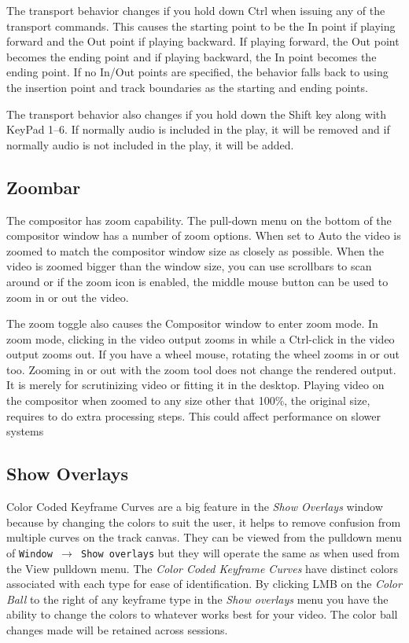 The transport behavior changes if you hold down Ctrl when issuing any of the transport commands. This causes the starting point to be the In point if playing forward and the Out point if playing backward. If playing forward, the Out point becomes the ending point and if playing backward, the In point becomes the ending point. If no In/Out points are specified, the behavior falls back to using the insertion point and track boundaries as the starting and ending points.

The transport behavior also changes if you hold down the Shift key along with KeyPad 1--6.  
If normally audio is included in the play, it will be removed and if normally audio is not included in the play, it will be added.


\subsection{Zoombar}%
\label{sub:zoombar}

The compositor has zoom capability. 
The pull-down menu on the bottom of the compositor window has a number of zoom options. 
When set to Auto the video is zoomed to match the compositor window size as closely as possible. 
When the video is zoomed bigger than the window size,  you can use scrollbars to scan around or if the zoom icon is enabled, the middle mouse button can be used to zoom in or out the video.

The zoom toggle also causes the Compositor window to enter zoom mode. 
In zoom mode, clicking in the video output zooms in while a Ctrl-click in the video output zooms out. 
If you have a wheel mouse, rotating the wheel zooms in or out too. 
Zooming in or out with the zoom tool does not change the rendered output. 
It is merely for scrutinizing video or fitting it in the desktop. Playing video on the compositor when zoomed to any size other that 100\%, the original size, requires \CGG{} to do extra processing steps. 
This could affect performance on slower systems

\subsection{Show Overlays}%
\label{sub:show_overlays}

Color Coded Keyframe Curves are a big feature in the \textit{Show Overlays} window because by changing the colors to suit the user, it helps to remove confusion from multiple curves on the track canvas.  
They can be viewed from the pulldown menu of \texttt{Window $\rightarrow$ Show overlays} but they will operate the same as when used from the View pulldown menu.  
The \textit{Color Coded Keyframe Curves} have distinct colors associated with each type for ease of identification.  
By clicking LMB on the \textit{Color Ball} to the right of any keyframe type in the \textit{Show overlays} menu you have the ability to change the colors to whatever works best for your video.  
The color ball changes made will be retained across sessions.

